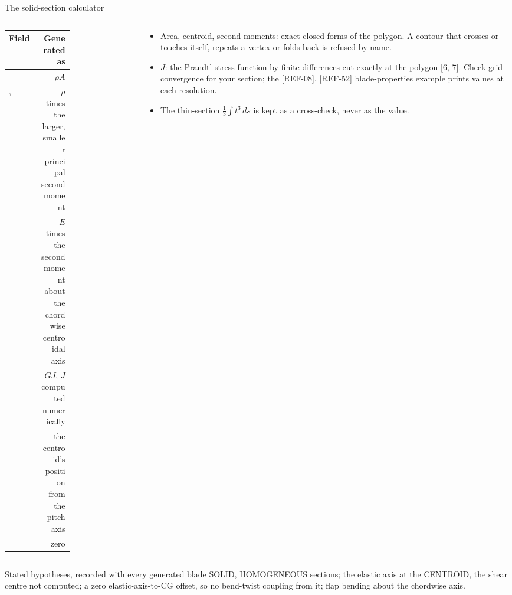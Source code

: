 \begin{frame}{The solid-section calculator}
\begin{columns}[T]
\begin{column}{0.60\textwidth}
{\ftstablesize\renewcommand{\arraystretch}{1.12}
\begin{tabularx}{\linewidth}{@{}P{0.50\linewidth}R@{}}
\toprule
\textbf{Field} & \textbf{Generated as} \\
\midrule
{} & \(\rho A\) \\
,  & \(\rho\) times the larger, smaller principal second moment \\
 & \(E\) times the second moment about the chordwise centroidal axis \\
 & \(G J\), \(J\) computed numerically \\
 & the centroid's position from the pitch axis \\
 & zero \\
\bottomrule
\end{tabularx}}
\end{column}
\begin{column}{0.36\textwidth}
\begin{itemize}\scriptsize
  \item Area, centroid, second moments: exact closed forms of the polygon.
        A contour that crosses or touches itself, repeats a vertex or folds
        back is refused by name.
  \item \(J\): the Prandtl stress function by finite differences cut exactly at
        the polygon [6, 7]. Check grid convergence for your section; the [REF-08], [REF-52]
        blade-properties example prints values at each resolution.
  \item The thin-section \(\frac13\!\int t^3\,ds\) is kept as a cross-check,
        never as the value.
\end{itemize}
\end{column}
\end{columns}
\par\vspace{1mm}
\begin{alertblock}{Stated hypotheses, recorded with every generated blade}
\scriptsize SOLID, HOMOGENEOUS sections; the elastic axis at the CENTROID, the
shear centre not computed; a zero elastic-axis-to-CG offset, so no bend-twist
coupling from it; flap bending about the chordwise axis.
\end{alertblock}
\end{frame}
